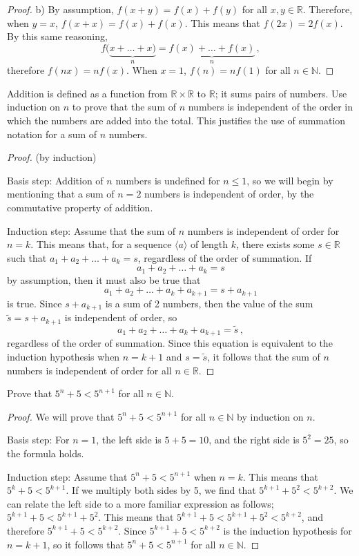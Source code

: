 \documentclass[10pt,letterpaper]{article}
\newcommand{\N}{\mathbb{N}}
\newcommand{\R}{\mathbb{R}}
\newenvironment{problem}[2][Problem]{\begin{trivlist}
\item[\hskip \labelsep {\bfseries #1}\hskip \labelsep {\bfseries #2.}]}{\end{trivlist}}
\begin{document}
\begin{proof}{b)}
By assumption, $f(x+y)=f(x)+f(y)$ for all $x, y \in \R$. Therefore, when $y=x$, $f(x+x)=f(x)+f(x)$. This means that $f(2x)=2f(x)$. By this same reasoning, $$f(\underbrace{x+\ldots+x)}_n = \underbrace{f(x)+\ldots+f(x)}_n \, ,$$therefore $f(nx)=nf(x)$. When $x=1$, $f(n) = nf(1)$ for all $n \in \N$. 
\end{proof}

\begin{problem}{3.42}
Addition is defined as a function from $\R \times \R$ to $\R$; it sums pairs of numbers. Use induction on $n$ to prove that the sum of $n$ numbers is independent of the order in which the numbers are added into the total. This justifies the use of summation notation for a sum of $n$ numbers.
\end{problem}

\begin{proof}{(by induction)}

Basis step: Addition of $n$ numbers is undefined for $n \leq 1$, so we will begin by mentioning that a sum of $n=2$ numbers is independent of order, by the commutative property of addition. 

Induction step: Assume that the sum of $n$ numbers is independent of order for $n=k$. This means that, for a sequence $\langle a \rangle$ of length $k$, there exists some $s \in \R$ such that $a_1+a_2+ \ldots + a_k = s$, regardless of the order of summation. If 
$$a_1+a_2+ \ldots + a_k = s$$
by assumption, then it must also be true that 
$$a_1+a_2+ \ldots + a_k +a_{k+1} = s+a_{k+1}$$
is true. Since $s+a_{k+1}$ is a sum of 2 numbers, then the value of the sum $\tilde{s}=s+a_{k+1}$ is independent of order, so 
$$a_1+a_2+ \ldots + a_k +a_{k+1} = \tilde{s} \, ,$$
regardless of the order of summation. Since this equation is equivalent to the induction hypothesis when $n=k+1$ and $s=\tilde{s}$, it follows that the sum of $n$ numbers is independent of order for all $n \in \R$.
\end{proof}

\begin{problem}{3.47}
Prove that $5^n + 5 < 5^{n+1}$ for all $n \in \N$. 
\end{problem}

\begin{proof}
We will prove that $5^n + 5 < 5^{n+1}$ for all $n \in \N$ by induction on $n$. 

Basis step: For $n=1$, the left side is $5+5=10$, and the right side is $5^2=25$, so the formula holds. 

Induction step: Assume that $5^n + 5 < 5^{n+1}$ when $n=k$. This means that $5^k+5<5^{k+1}$. If we multiply both sides by 5, we find that $5^{k+1}+5^2<5^{k+2}$. We can relate the left side to a more familiar expression as follows; $5^{k+1}+5<5^{k+1}+5^2$. This means that $5^{k+1}+5<5^{k+1}+5^2<5^{k+2}$, and therefore $5^{k+1}+5<5^{k+2}$. Since $5^{k+1}+5<5^{k+2}$ is the induction hypothesis for $n=k+1$, so it follows that $5^n + 5 < 5^{n+1}$ for all $n \in \N$.
\end{proof}
\end{document}
